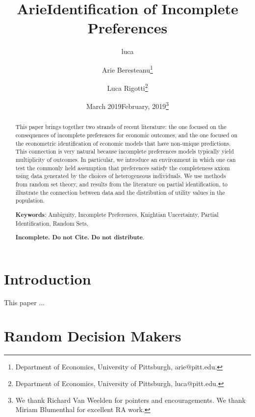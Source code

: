\documentclass{article}
\title{Arie}
\author{luca }
\date{March 2019}
\begin{document}
\title{Identification of Incomplete Preferences}
\author{Arie Beresteanu\thanks{%
Department of Economics, University of Pittsburgh, arie@pitt.edu. } \and %
Luca Rigotti\thanks{%
Department of Economics, University of Pittsburgh, luca@pitt.edu.}}
\date{February, 2019\thanks{%
We thank Richard Van Weelden for pointers and encouragements. We thank
Miriam Blumenthal for excellent RA work.}}
\maketitle

\begin{abstract}
This paper brings together two strands of recent literature: the one focused
on the consequences of incomplete preferences for economic outcomes, and the
one focused on the econometric identification of economic models that have
non-unique predictions. This connection is very natural because incomplete
preferences models typically yield multiplicity of outcomes. In particular,
we introduce an environment in which one can test the commonly held
assumption that preferences satisfy the completeness axiom using data
generated by the choices of heterogeneous individuals. We use methods from
random set theory, and results from the literature on partial
identification, to illustrate the connection between data and the
distribution of utility values in the population.

\bigskip

\noindent \textbf{Keywords}: Ambiguity, Incomplete Preferences, Knightian
Uncertainty, Partial Identification, Random Sets.

\bigskip

\textbf{Incomplete. Do not Cite. Do not distribute}.
\end{abstract}

\thispagestyle{empty}

\setlength{\baselineskip}{.26in}\newpage

\setcounter{page}{1}

\section{Introduction}
\label{introduction}

This paper ...

\section{Random Decision Makers}
\label{randomDecisionMakers}
\end{document}
